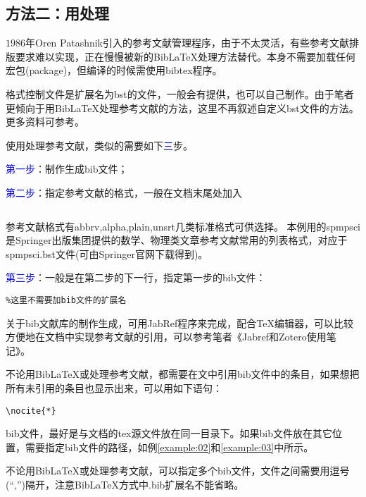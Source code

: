 \documentclass[cn,hazy,blue,14pt,geye,normal,]{elegantnote}
\begin{document}
\subsection{方法二：用\BibTeX{}处理}
\(1986\)年Oren Patashnik引入的参考文献管理程序\BibTeX{}，由于不太灵活，有些参考文献排版要求难以实现，正在慢慢被新的Bib\LaTeX{}处理方法替代。\BibTeX{}本身不需要加载任何宏包(package)，但编译的时候需使用bibtex程序。\par
\BibTeX{}格式控制文件是扩展名为bst的文件，一般会有提供，也可以自己制作。由于笔者更倾向于用Bib\LaTeX{}处理参考文献的方法，这里不再叙述自定义bst文件的方法。更多\BibTeX{}资料可参考\cite{胡伟2013LATEX,chikilyyongfeng2019,mittelbach2004latex}。\par
使用\BibTeX{}处理参考文献，类似的需要如下\textcolor{blue}{三}步。\par
\textcolor{blue}{第一步}：制作生成bib文件；\par
\textcolor{blue}{第二步}：指定参考文献的格式，一般在文档末尾处加入
\begin{example}
\begin{lstlisting}

\end{lstlisting}\par
\end{example}
参考文献格式有abbrv,alpha,plain,unsrt几类标准格式可供选择。
本例用的spmpsci是Springer出版集团提供的数学、物理类文章参考文献常用的列表格式，对应于spmpsci.bst文件(可由Springer官网下载得到)。\par
\textcolor{blue}{第三步}：一般是在第二步的下一行，指定第一步的bib文件：
\begin{example}
\label{example:03}
\begin{lstlisting}
%这里不需要加bib文件的扩展名
\end{lstlisting}
\end{example}
\begin{note}
	关于bib文献库的制作生成，可用JabRef程序来完成，配合\TeX{}编辑器，可以比较方便地在文档中实现参考文献的引用，可以参考笔者《Jabref和Zotero使用笔记》\cite{zalois20200424}。
\end{note}
\begin{note}
	不论用Bib\LaTeX{}或\BibTeX{}处理参考文献，都需要在文中引用bib文件中的条目，如果想把所有未引用的条目也显示出来，可以用如下语句：
\begin{lstlisting}
\nocite{*}
\end{lstlisting}
\end{note}
\begin{note}
	bib文件，最好是与文档的tex源文件放在同一目录下。如果bib文件放在其它位置，需要指定bib文件的路径，如例\ref{example:02}和\ref{example:03}中所示。
\end{note}
\begin{note}
	不论用Bib\LaTeX{}或\BibTeX{}处理参考文献，可以指定多个bib文件，文件之间需要用逗号(``,'')隔开，注意Bib\LaTeX{}方式中.bib扩展名不能省略。
\end{note}
\end{document}
